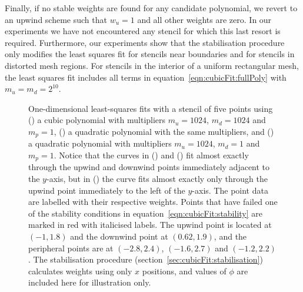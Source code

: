 Finally, if no stable weights are found for any candidate polynomial, we revert to an upwind scheme such that $w_u = 1$ and all other weights are zero.
In our experiments we have not encountered any stencil for which this last resort is required.
Furthermore, our experiments show that the stabilisation procedure only modifies the least squares fit for stencils near boundaries and for stencils in distorted mesh regions.
For stencils in the interior of a uniform rectangular mesh, the least squares fit includes all terms in equation~\eqref{eqn:cubicFit:fullPoly} with $m_u = m_d = 2^{10}$.

\begin{figure}
	\centering
	\begin{subfigure}{\textwidth}
		\centering
		
		\label{fig:cubicFit:oscillatory1D:cubic}
		\label{fig:cubicFit:oscillatory1D:quadratic}
		\label{fig:cubicFit:oscillatory1D:quadraticUpwind}
	\end{subfigure}
	\caption{One-dimensional least-squares fits with a stencil of five points using
	() a cubic polynomial with multipliers $m_u = 1024$, $m_d = 1024$ and $m_p = 1$,
	() a quadratic polynomial with the same multipliers, and
	() a quadratic polynomial with multipliers $m_u = 1024$, $m_d = 1$ and $m_p = 1$.
	Notice that the curves in
	() and
	() fit almost exactly through the upwind and downwind points immediately adjacent to the $y$-axis, but in
	() the curve fits almost exactly only through the upwind point immediately to the left of the $y$-axis.  The point data are labelled with their respective weights.
	Points that have failed one of the stability conditions in equation~\eqref{eqn:cubicFit:stability} are marked in red with italicised labels.  The upwind point is located at $(-1, 1.8)$ and the downwind point at $(0.62, 1.9)$, and the peripheral points are at $(-2.8, 2.4)$, $(-1.6, 2.7)$ and $(-1.2, 2.2)$.  The stabilisation procedure (section~\ref{sec:cubicFit:stabilisation}) calculates weights using only $x$ positions, and values of $\phi$ are included here for illustration only.}
	\label{fig:cubicFit:oscillatory1D}
\end{figure}

